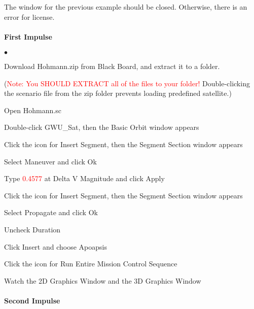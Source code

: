 \documentclass[10pt]{article}
\theoremstyle{plain}\theorembodyfont{\normalfont}
\renewcommand\emph[1]{\textsf{#1}}
\begin{document}
The window for the previous example should be closed. Otherwise, there is an error for license.

\paragraph{First Impulse}

\begin{list}{$\bullet$}
{\setlength{\itemsep}{-3pt}\setlength{\leftmargin}{30pt}}
\item Download \emph{Hohmann.zip} from Black Board, and extract it to a folder.

(\textcolor{red}{Note: You SHOULD EXTRACT all of the files to your folder!} Double-clicking the scenario file from the zip folder prevents loading predefined satellite.)

\item Open \emph{Hohmann.sc}
\item Double-click \emph{GWU\_Sat}, then the \emph{Basic Orbit} window appears
\item Click the icon for \emph{Insert Segment}, then the \emph{Segment Section} window appears
\item Select \emph{Maneuver} and click \emph{Ok}
\item Type \textcolor{red}{\emph{0.4577}} at \emph{Delta V Magnitude} and click \emph{Apply}
\item Click the icon for \emph{Insert Segment}, then the \emph{Segment Section} window appears
\item Select \emph{Propagate} and click \emph{Ok}
\item Uncheck \emph{Duration}
\item Click \emph{Insert} and choose \emph{Apoapsis}
\item Click the icon for \emph{Run Entire Mission Control Sequence}
\item Watch the \emph{2D Graphics Window} and the \emph{3D Graphics Window}
\end{list}

\paragraph{Second Impulse}
\end{document}
